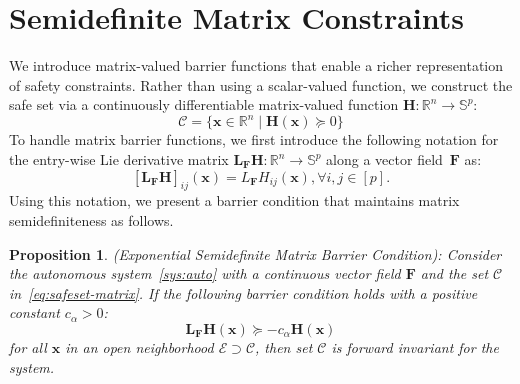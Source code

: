 \documentclass[10pt,twocolumn,twoside]{IEEEtran}
\newcommand{\real}{\mathbb{R}}
\newcommand{\until}[1]{[#1]}
\newcommand{\map}[3]{#1:#2 \rightarrow #3}
\newcommand{\longthmtitle}[1]{\mbox{}{\textit{(#1):}}}
\newcommand{\setdefb}[2]{\big\{#1 \; | \; #2\big\}}
\newcommand{\Cc}{\mathcal{C}}
\newcommand{\Ec}{\mathcal{E}}
\newtheorem{proposition}{Proposition}
\theoremstyle{definition}
\newcommand{\bx}{\mathbf{x}}
\newcommand{\bF}{\mathbf{F}}
\newcommand{\bH}{\mathbf{H}}
\newcommand{\bL}{\mathbf{L}}
\begin{document}
\section{Semidefinite Matrix Constraints}
\label{sec:EMCBF}
We introduce matrix-valued barrier functions that enable a richer representation of safety constraints. Rather than using a scalar-valued function, we construct the safe set via a continuously differentiable matrix-valued function $\map{\bH}{\real^n}{\mathbb S^p}$:
\begin{equation}
    \label{eq:safeset-matrix}
    \Cc = \setdefb{\bx\in\real^n}{\bH(\bx)\succeq 0}
\end{equation}
To handle matrix barrier functions, we first introduce the following notation for the entry-wise Lie derivative matrix $\map{\bL_\bF\bH}{\real^n}{\mathbb S^p}$ along a vector field~$\bF$ as:
$$
    [\bL_\bF\bH]_{ij}(\bx) = L_\bF H_{ij}(\bx), \forall i,j\in\until{p}.
$$
Using this notation, we present a barrier condition that maintains matrix semidefiniteness as follows.
\begin{proposition}\longthmtitle{Exponential Semidefinite Matrix Barrier Condition}
    \label{prop:BC-matrix}
    Consider the autonomous system~\eqref{sys:auto} with a continuous vector field $\bF$ and the set $\Cc$ in~\eqref{eq:safeset-matrix}. If the following barrier condition holds with a positive constant $c_\alpha>0$:
    \begin{equation}
        \label{eq:BC-matrix}
        \bL_\bF\bH(\bx) \succeq -c_\alpha\bH(\bx)
    \end{equation}
    for all $\bx$ in an open neighborhood $\Ec\supset\Cc$, then set $\Cc$ is forward invariant for the system.
\end{proposition}
\end{document}

